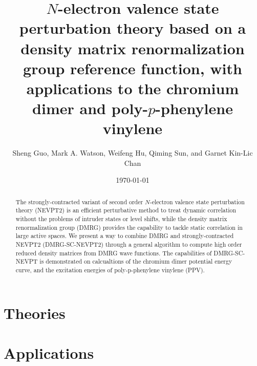 \documentclass[
 aip,
 jcp,
 numerical ,
 reprint, %
]{revtex4-1}
\begin{document}
\title{$N$-electron valence state perturbation theory based on a density matrix renormalization group reference function, with applications to the chromium dimer and 
poly-$p$-phenylene vinylene}
\author{Sheng Guo, Mark A. Watson, Weifeng Hu, Qiming Sun, and Garnet Kin-Lic Chan}

\begin{abstract}

The strongly-contracted variant of second order $N$-electron valence state perturbation theory (NEVPT2) is an efficient perturbative method to 
treat dynamic correlation without the problems of intruder states or level shifts, while the density matrix renormalization group (DMRG) 
provides the capability to tackle static correlation in large active spaces. 
We present a way to combine DMRG and strongly-contracted NEVPT2 (DMRG-SC-NEVPT2) through a general algorithm to compute high order 
reduced density matrices from DMRG wave functions. The capabilities of DMRG-SC-NEVPT is demonstrated on calcualtions of the chromium dimer 
potential energy curve, and the excitation energies of poly-p-phenylene vinylene (PPV).

\end{abstract}

\date{\today}

\maketitle



\section{Theories}







\section{Applications}










{}
\end{document}
